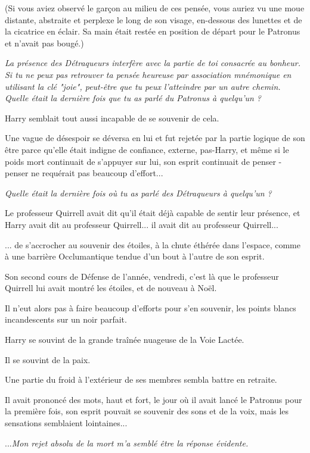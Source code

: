 (Si vous aviez observé le garçon au milieu de ces pensée, vous auriez vu une moue distante, abstraite et perplexe le long de son visage, en-dessous des lunettes et de la cicatrice en éclair. Sa main était restée en position de départ pour le Patronus et n'avait pas bougé.)

\emph{La présence des Détraqueurs interfère avec la partie de toi consacrée au bonheur. Si tu ne peux pas retrouver ta pensée heureuse par association mnémonique en utilisant la clé "joie", peut-être que tu peux l'atteindre par un autre chemin. Quelle était la dernière fois que tu as parlé du Patronus à quelqu'un ?} 

Harry semblait tout aussi incapable de se souvenir de cela.

Une vague de désespoir se déversa en lui et fut rejetée par la partie logique de son être parce qu'elle était indigne de confiance, externe, pas-Harry, et même si le poids mort continuait de s'appuyer sur lui, son esprit continuait de penser - penser ne requérait pas beaucoup d'effort...

\emph{Quelle était la dernière fois où tu as parlé des Détraqueurs à quelqu'un ?} 

Le professeur Quirrell avait dit qu'il était déjà capable de sentir leur présence, et Harry avait dit au professeur Quirrell... il avait dit au professeur Quirrell...

... de s'accrocher au souvenir des étoiles, à la chute éthérée dans l'espace, comme à une barrière Occlumantique tendue d'un bout à l'autre de son esprit.

Son second cours de Défense de l'année, vendredi, c'est là que le professeur Quirrell lui avait montré les étoiles, et de nouveau à Noël.

Il n'eut alors pas à faire beaucoup d'efforts pour s'en souvenir, les points blancs incandescents sur un noir parfait.

Harry se souvint de la grande traînée nuageuse de la Voie Lactée.

Il se souvint de la paix.

Une partie du froid à l'extérieur de ses membres sembla battre en retraite.

Il avait prononcé des mots, haut et fort, le jour où il avait lancé le Patronus pour la première fois, son esprit pouvait se souvenir des sons et de la voix, mais les sensations semblaient lointaines...

...\emph{Mon rejet absolu de la mort m'a semblé être la réponse évidente.} 

